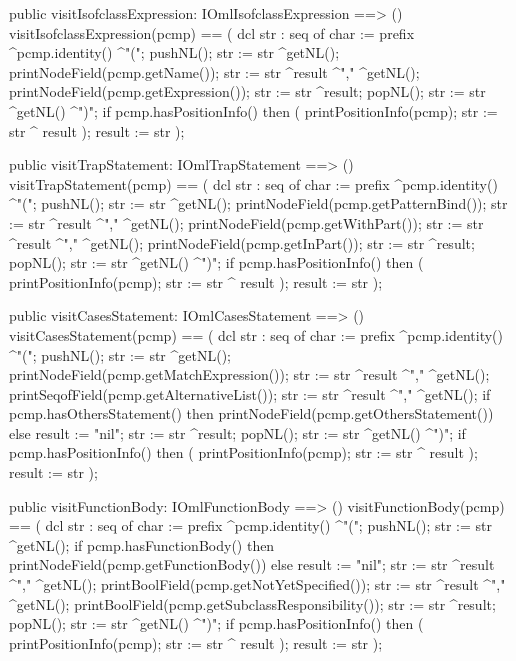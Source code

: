 \begin{vdm_al}
  public visitIsofclassExpression: IOmlIsofclassExpression ==> ()
  visitIsofclassExpression(pcmp) ==
    ( dcl str : seq of char := prefix ^pcmp.identity() ^"(";
      pushNL();
      str := str ^getNL();
      printNodeField(pcmp.getName());
      str := str ^result ^"," ^getNL();
      printNodeField(pcmp.getExpression());
      str := str ^result;
      popNL();
      str := str ^getNL() ^")";
      if pcmp.hasPositionInfo()
      then ( printPositionInfo(pcmp);
             str := str ^ result );
      result := str );

  public visitTrapStatement: IOmlTrapStatement ==> ()
  visitTrapStatement(pcmp) ==
    ( dcl str : seq of char := prefix ^pcmp.identity() ^"(";
      pushNL();
      str := str ^getNL();
      printNodeField(pcmp.getPatternBind());
      str := str ^result ^"," ^getNL();
      printNodeField(pcmp.getWithPart());
      str := str ^result ^"," ^getNL();
      printNodeField(pcmp.getInPart());
      str := str ^result;
      popNL();
      str := str ^getNL() ^")";
      if pcmp.hasPositionInfo()
      then ( printPositionInfo(pcmp);
             str := str ^ result );
      result := str );

  public visitCasesStatement: IOmlCasesStatement ==> ()
  visitCasesStatement(pcmp) ==
    ( dcl str : seq of char := prefix ^pcmp.identity() ^"(";
      pushNL();
      str := str ^getNL();
      printNodeField(pcmp.getMatchExpression());
      str := str ^result ^"," ^getNL();
      printSeqofField(pcmp.getAlternativeList());
      str := str ^result ^"," ^getNL();
      if pcmp.hasOthersStatement()
      then printNodeField(pcmp.getOthersStatement())
      else result := "nil";
      str := str ^result;
      popNL();
      str := str ^getNL() ^")";
      if pcmp.hasPositionInfo()
      then ( printPositionInfo(pcmp);
             str := str ^ result );
      result := str );

  public visitFunctionBody: IOmlFunctionBody ==> ()
  visitFunctionBody(pcmp) ==
    ( dcl str : seq of char := prefix ^pcmp.identity() ^"(";
      pushNL();
      str := str ^getNL();
      if pcmp.hasFunctionBody()
      then printNodeField(pcmp.getFunctionBody())
      else result := "nil";
      str := str ^result ^"," ^getNL();
      printBoolField(pcmp.getNotYetSpecified());
      str := str ^result ^"," ^getNL();
      printBoolField(pcmp.getSubclassResponsibility());
      str := str ^result;
      popNL();
      str := str ^getNL() ^")";
      if pcmp.hasPositionInfo()
      then ( printPositionInfo(pcmp);
             str := str ^ result );
      result := str );


\end{vdm_al}
